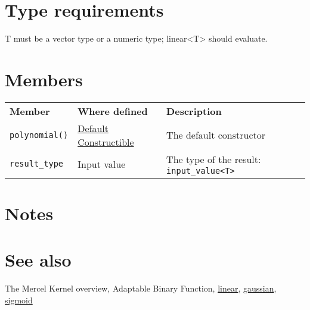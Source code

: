\documentclass{article}
\begin{document}
\section*{Type requirements}

T must be a vector type or a numeric type; linear<T> should evaluate.


\section*{Members}

\begin{tabular}{lll}
\textbf{Member} & \textbf{Where defined} & \textbf{Description} \\ 
\texttt{polynomial()} & \href{http://www.sgi.com/tech/stl/DefaultConstructible.html}{Default Constructible} & The default constructor \\
\texttt{result_type} & Input value & The type of the result: \texttt{input_value<T>} \\
\end{tabular}

\section*{Notes}

\section*{See also}

The Mercel Kernel overview, Adaptable Binary Function,
\href{research/kml/documentation/linear.html}{linear}, 
\href{research/kml/documentation/gaussian.html}{gaussian}, 
\href{research/kml/documentation/sigmoid.html}{sigmoid}




\end{document}

